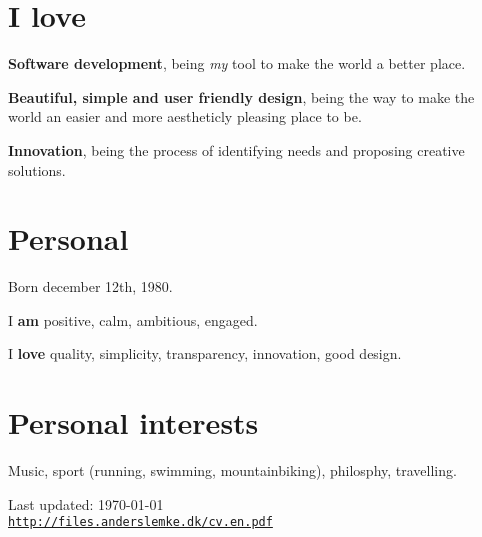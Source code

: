 \documentclass[a4paper]{article}
\renewenvironment{itemize}{
  \begin{list}{}
    { \setlength{\itemsep}{5pt}
      \setlength{\parsep}{0pt}
      \setlength{\topsep}{0pt}
      \setlength{\leftmargin}{0em} } }{
  \end{list}}
\begin{document}
\section*{I love}

\begin{itemize}
  \item \textbf{Software development}, being \emph{my} tool to make the world a better place.
  \item \textbf{Beautiful, simple and user friendly design}, being the way to make the world an easier and more aestheticly  pleasing place to be.
  \item \textbf{Innovation}, being the process of identifying needs and proposing creative solutions.
\end{itemize}


\section*{Personal}
Born december 12th, 1980.

I \textbf{am} positive, calm, ambitious, engaged.

I \textbf{love} quality, simplicity, transparency, innovation, good design.

\section*{Personal interests} 

Music, sport (running, swimming, mountainbiking), philosphy, travelling.

\bigskip

\begin{center}
\begin{footnotesize}
Last updated: \today \\
\href{http://files.anderslemke.dk/cv.en.pdf}{\tt http://files.anderslemke.dk/cv.en.pdf}
\end{footnotesize}
\end{center}
\end{document}

